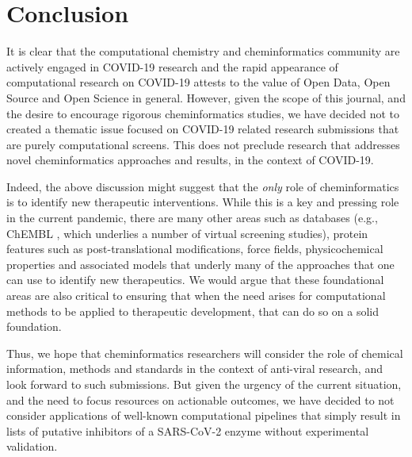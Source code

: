 \documentclass{bmcart}
\begin{document}
\section*{Conclusion}

It is clear that the computational chemistry and cheminformatics
community are actively engaged in COVID-19 research and the rapid
appearance of computational research \cite{jcim_covid_editorial} on
COVID-19 attests to the value of Open Data, Open Source and Open
Science in general. However, given the scope of this journal, and the
desire to encourage rigorous cheminformatics studies, we have decided
not to created a thematic issue focused on COVID-19 related research
submissions that are purely computational screens. This does not
preclude research that addresses novel cheminformatics approaches and
results, in the context of COVID-19.

Indeed, the above discussion might suggest that the \emph{only} role
of cheminformatics is to identify new therapeutic interventions. While
this is a key and pressing role in the current pandemic, there are
many other areas such as databases (e.g., ChEMBL \cite{chembl}, which
underlies a number of virtual screening studies), protein features
such as post-translational modifications, force fields,
physicochemical properties and associated models that underly many of
the approaches that one can use to identify new therapeutics. We would
argue that these foundational areas are also critical to ensuring that
when the need arises for computational methods to be applied to
therapeutic development, that can do so on a solid foundation.

Thus, we hope that cheminformatics researchers will consider the role
of chemical information, methods and standards in the context of
anti-viral research, and look forward to such submissions. But given
the urgency of the current situation, and the need to focus resources
on actionable outcomes, we have decided to not consider applications
of well-known computational pipelines that simply result in lists of
putative inhibitors of a SARS-CoV-2 enzyme without experimental
validation.
\end{document}
